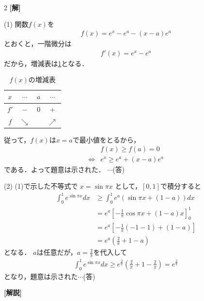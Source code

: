 \documentclass[../../../../main.tex]{subfiles}
\begin{document}
\setcounter{equation}{0}
\begin{oframed}
  
\end{oframed}
\setlength{\columnseprule}{0.4pt}
\begin{multicols}{2}
  {\bf[解]}

  (1)
  関数$f(x)$を
  \begin{align*}
    f(x) = e^x - e^a - (x-a)e^a
  \end{align*}
  とおくと，一階微分は
  \begin{align*}
    f'(x) = e^x - e^a
  \end{align*}
  だから，増減表は\cref{1991-6:table:1}となる．
  \begin{table}[H]
    \centering
    \caption{$f(x)$の増減表}
    \label{1991-6:table:1}
    \begin{tabular}{|c||c|c|c|}
      \hline
      $x$  & $\cdots$   & $a$ & $\cdots$   \\
      \hline
      $f'$ & $-$        & $0$ & $+$        \\
      \hline
      $f$  & $\searrow$ &     & $\nearrow$ \\
      \hline
    \end{tabular}
  \end{table}
  従って，$f(x)$は$x=a$で最小値をとるから，
  \begin{align*}
     & f(x) \ge f(a) = 0      \\
    \iff
     & e^x \ge e^a + (x-a)e^a
  \end{align*}
  である．よって題意は示された． $\cdots$(答)

  \vspace{10pt}
  (2)
  (1)で示した不等式で $x = \sin\pi x$ として，$[ 0, 1]$で積分すると
  \begin{align*}
    \int_0^1 e^{\sin\pi x} dx & \ge \int_0^1 e^a(\sin\pi x + (1-a)) dx                    \\
                              & = e^a \left[ -\frac{1}{\pi}\cos\pi x + (1-a)x \right]_0^1 \\
                              & = e^a \left[ -\frac{1}{\pi}(-1-1) + (1-a) \right]         \\
                              & = e^a \left( \frac{2}{\pi} + 1 - a  \right)
  \end{align*}
  となる．
  $a$は任意だが，$a=\frac{2}{\pi}$を代入して
  \begin{align*}
    \int_0^1 e^{\sin\pi x} dx \ge e^{\frac{2}{\pi}} \left( \frac{2}{\pi} + 1 - \frac{2}{\pi} \right) = e^{\frac{2}{\pi}}
  \end{align*}
  となり，題意は示された$\cdots$(答)

  \vspace{10pt}
  {\bf[解説]}

  \newpage
\end{multicols}
\end{document}
